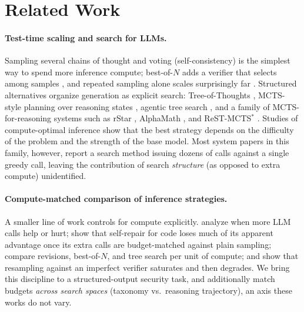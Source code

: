 \section{Related Work}
\label{sec:related}

\paragraph{Test-time scaling and search for LLMs.}
Sampling several chains of thought and voting (self-consistency)
\citep{wang2023selfconsistency} is the simplest way to spend more inference
compute; best-of-$N$ adds a verifier that selects among samples
\citep{cobbe2021verifiers}, and repeated sampling alone scales surprisingly far
\citep{brown2024monkeys}. Structured alternatives organize generation as explicit
search: Tree-of-Thoughts \citep{yao2023tot}, MCTS-style planning over reasoning
states \citep{hao2023rap}, agentic tree search \citep{zhou2024lats}, and a family
of MCTS-for-reasoning systems such as rStar \citep{qi2024rstar}, AlphaMath
\citep{chen2024alphamath}, and ReST-MCTS$^{*}$ \citep{zhang2024restmcts}. Studies
of compute-optimal inference \citep{snell2024scaling,wu2025inference} show that the
best strategy depends on the difficulty of the problem and the strength of the
base model. Most system papers in this family, however, report a search method
issuing dozens of calls against a single greedy call, leaving the contribution of
search \emph{structure} (as opposed to extra compute) unidentified.

\paragraph{Compute-matched comparison of inference strategies.}
A smaller line of work controls for compute explicitly. \citet{chen2024morecalls}
analyze when more LLM calls help or hurt; \citet{olausson2024selfrepair} show that
self-repair for code loses much of its apparent advantage once its extra calls are
budget-matched against plain sampling; \citet{snell2024scaling} compare revisions,
best-of-$N$, and tree search per unit of compute; and \citet{stroebl2024flaws}
show that resampling against an imperfect verifier saturates and then degrades.
We bring this discipline to a structured-output security task, and additionally
match budgets \emph{across search spaces} (taxonomy vs.\ reasoning trajectory),
an axis these works do not vary.

